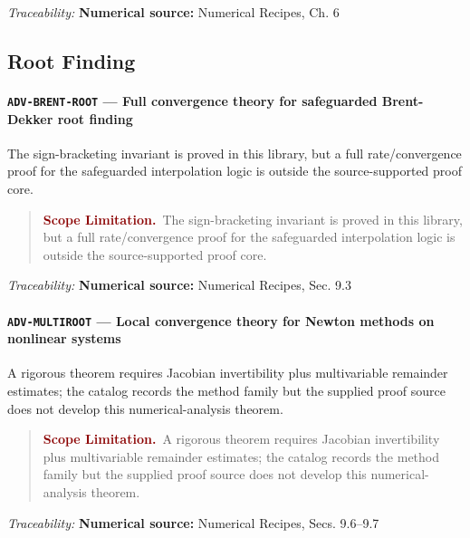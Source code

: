 \documentclass[10pt]{article}
\newcommand{\pidraw}[1]{\begingroup\urlstyle{tt}\nolinkurl{#1}\endgroup}
\theoremstyle{definition}
\theoremstyle{remark}
\newenvironment{scopelimitation}
{\begin{quote}\small\noindent\textbf{\textcolor{darkred}{Scope Limitation.}}\ }
{\end{quote}}
\begin{document}
\smallskip\noindent\textit{Traceability:} \textbf{Numerical source:} Numerical Recipes, Ch. 6\par

\subsection{Root Finding}

\label{prf:ADV-BRENT-ROOT}

\paragraph{\pidraw{ADV-BRENT-ROOT} --- Full convergence theory for safeguarded Brent-Dekker root finding}

The sign-bracketing invariant is proved in this library, but a full rate/convergence proof for the safeguarded interpolation logic is outside the source-supported proof core.

\begin{scopelimitation}The sign-bracketing invariant is proved in this library, but a full rate/convergence proof for the safeguarded interpolation logic is outside the source-supported proof core.\end{scopelimitation}

\smallskip\noindent\textit{Traceability:} \textbf{Numerical source:} Numerical Recipes, Sec. 9.3\par

\label{prf:ADV-MULTIROOT}

\paragraph{\pidraw{ADV-MULTIROOT} --- Local convergence theory for Newton methods on nonlinear systems}

A rigorous theorem requires Jacobian invertibility plus multivariable remainder estimates; the catalog records the method family but the supplied proof source does not develop this numerical-analysis theorem.

\begin{scopelimitation}A rigorous theorem requires Jacobian invertibility plus multivariable remainder estimates; the catalog records the method family but the supplied proof source does not develop this numerical-analysis theorem.\end{scopelimitation}

\smallskip\noindent\textit{Traceability:} \textbf{Numerical source:} Numerical Recipes, Secs. 9.6--9.7\par
\end{document}
